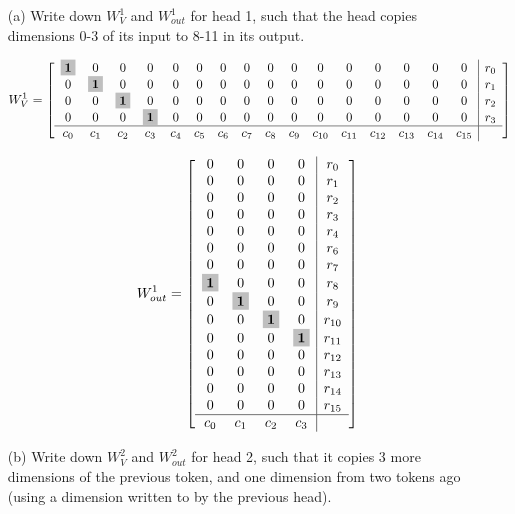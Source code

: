 \documentclass[11pt]{article}
\newenvironment{answerbox}%
  {\begin{mdframed}[linecolor=darkgray,%
                    roundcorner=10pt,innertopmargin=10pt,%
                    innerbottommargin=10pt,skipabove=12pt,skipbelow=12pt]}%
  {\end{mdframed}}
\newcommand{\bigmath}[1]{\colorbox{lightgray}{$\mathbf{#1}$}}
\begin{document}
\begin{itemize}
    \item[(a)] Write down $W_V^1$ and $W_{out}^1$ for head 1, such that the head copies dimensions 0-3 of its input to 8-11 in its output.

    \begin{answerbox}
$$
W_V^1 = \left[
\begin{array}{*{16}c|c}
\bigmath{1} & 0 & 0 & 0 & 0 & 0 & 0 & 0 & 0 & 0 & 0 & 0 & 0 & 0 & 0 & 0 & r_0 \\
0 & \bigmath{1} & 0 & 0 & 0 & 0 & 0 & 0 & 0 & 0 & 0 & 0 & 0 & 0 & 0 & 0 & r_1 \\
0 & 0 & \bigmath{1} & 0 & 0 & 0 & 0 & 0 & 0 & 0 & 0 & 0 & 0 & 0 & 0 & 0 & r_2 \\
0 & 0 & 0 & \bigmath{1} & 0 & 0 & 0 & 0 & 0 & 0 & 0 & 0 & 0 & 0 & 0 & 0 & r_3 \\
\hline
c_0 & c_1 & c_2 & c_3 & c_4 & c_5 & c_6 & c_7 & c_8 & c_9 & c_{10} & c_{11} & c_{12} & c_{13} & c_{14} & c_{15} &
\end{array}
\right]
$$

$$
W_{out}^1 = \left[
\begin{array}{*{4}c|c}
0 & 0 & 0 & 0 & r_0 \\
0 & 0 & 0 & 0 & r_1 \\
0 & 0 & 0 & 0 & r_2 \\
0 & 0 & 0 & 0 & r_3 \\
0 & 0 & 0 & 0 & r_4 \\
0 & 0 & 0 & 0 & r_6 \\
0 & 0 & 0 & 0 & r_7 \\
\bigmath{1} & 0 & 0 & 0 & r_8 \\
0 & \bigmath{1} & 0 & 0 & r_9 \\
0 & 0 & \bigmath{1} & 0 & r_{10} \\
0 & 0 & 0 & \bigmath{1} & r_{11} \\
0 & 0 & 0 & 0 & r_{12} \\
0 & 0 & 0 & 0 & r_{13} \\
0 & 0 & 0 & 0 & r_{14} \\
0 & 0 & 0 & 0 & r_{15} \\
\hline
c_0 & c_1 & c_2 & c_3 &
\end{array}
\right]
$$
    \end{answerbox}

    \item[(b)] Write down $W_V^2$ and $W_{out}^2$ for head 2, such that it copies 3 more dimensions of the previous token, and one dimension from two tokens ago (using a dimension written to by the previous head).


\end{itemize}
\end{document}
